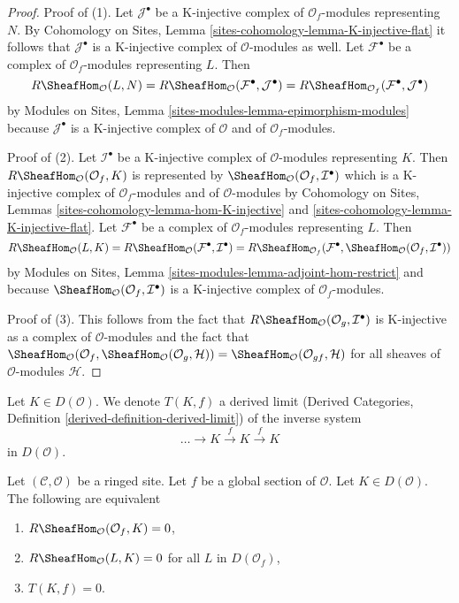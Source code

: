 \begin{proof}
Proof of (1). Let $\mathcal{J}^\bullet$ be a K-injective complex of
$\mathcal{O}_f$-modules representing $N$. By Cohomology on Sites, Lemma
\ref{sites-cohomology-lemma-K-injective-flat} it follows that
$\mathcal{J}^\bullet$ is a K-injective complex of
$\mathcal{O}$-modules as well. Let $\mathcal{F}^\bullet$ be a complex of
$\mathcal{O}_f$-modules representing $L$. Then
$$
R\SheafHom_\mathcal{O}(L, N) =
R\SheafHom_\mathcal{O}(\mathcal{F}^\bullet, \mathcal{J}^\bullet) =
R\SheafHom_{\mathcal{O}_f}(\mathcal{F}^\bullet, \mathcal{J}^\bullet)
$$
by
Modules on Sites, Lemma \ref{sites-modules-lemma-epimorphism-modules}
because $\mathcal{J}^\bullet$ is a K-injective complex of $\mathcal{O}$
and of $\mathcal{O}_f$-modules.

\medskip\noindent
Proof of (2). Let $\mathcal{I}^\bullet$ be a K-injective complex of
$\mathcal{O}$-modules representing $K$.
Then $R\SheafHom_\mathcal{O}(\mathcal{O}_f, K)$ is represented by
$\SheafHom_\mathcal{O}(\mathcal{O}_f, \mathcal{I}^\bullet)$ which is
a K-injective complex of $\mathcal{O}_f$-modules and of
$\mathcal{O}$-modules by
Cohomology on Sites, Lemmas \ref{sites-cohomology-lemma-hom-K-injective} and
\ref{sites-cohomology-lemma-K-injective-flat}.
Let $\mathcal{F}^\bullet$ be a complex of $\mathcal{O}_f$-modules
representing $L$. Then
$$
R\SheafHom_\mathcal{O}(L, K) =
R\SheafHom_\mathcal{O}(\mathcal{F}^\bullet, \mathcal{I}^\bullet) =
R\SheafHom_{\mathcal{O}_f}(\mathcal{F}^\bullet,
\SheafHom_\mathcal{O}(\mathcal{O}_f, \mathcal{I}^\bullet))
$$
by Modules on Sites, Lemma \ref{sites-modules-lemma-adjoint-hom-restrict}
and because $\SheafHom_\mathcal{O}(\mathcal{O}_f, \mathcal{I}^\bullet)$ is a
K-injective complex of $\mathcal{O}_f$-modules.

\medskip\noindent
Proof of (3). This follows from the fact that
$R\SheafHom_\mathcal{O}(\mathcal{O}_g, \mathcal{I}^\bullet)$
is K-injective as a complex of $\mathcal{O}$-modules and the fact that
$\SheafHom_\mathcal{O}(\mathcal{O}_f,
\SheafHom_\mathcal{O}(\mathcal{O}_g, \mathcal{H})) = 
\SheafHom_\mathcal{O}(\mathcal{O}_{gf}, \mathcal{H})$
for all sheaves of $\mathcal{O}$-modules $\mathcal{H}$.
\end{proof}

\noindent
Let $K \in D(\mathcal{O})$. We denote
$T(K, f)$ a derived limit (Derived Categories, Definition
\ref{derived-definition-derived-limit}) of the inverse system
$$
\ldots \to K \xrightarrow{f} K \xrightarrow{f} K
$$
in $D(\mathcal{O})$.

\begin{lemma}
\label{lemma-hom-from-Af}
Let $(\mathcal{C}, \mathcal{O})$ be a ringed site. Let $f$ be a global
section of $\mathcal{O}$. Let $K \in D(\mathcal{O})$.
The following are equivalent
\begin{enumerate}
\item $R\SheafHom_\mathcal{O}(\mathcal{O}_f, K) = 0$,
\item $R\SheafHom_\mathcal{O}(L, K) = 0$ for all $L$ in $D(\mathcal{O}_f)$,
\item $T(K, f) = 0$.
\end{enumerate}
\end{lemma}

